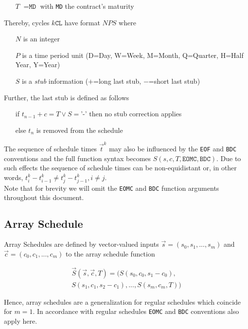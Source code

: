 \documentclass[9pt,oneside]{amsart}
\newcommand{\attr}[1]{\texttt{#1}}
\newcommand{\sdl}[3]{S(#1,#2,#3)}
\newcommand{\vsdl}[3]{\vec{S}(#1,#2,#3)}
\begin{document}
\begin{multicols}{2}
\begin{itemize}
	\item[$T$] $=\attr{MD}$ with \attr{MD} the contract's maturity
\end{itemize}

Thereby, cycles $k\attr{CL}$ have format $NPS$ where

\begin{itemize}
	\item[$N$] is an integer
	\item[$P$] is a time period unit (D=Day, W=Week, M=Month, Q=Quarter, H=Half Year, Y=Year)
	\item[$S$] is a \textit{stub} information ($+$=long last stub, $-$=short last stub)
\end{itemize}

Further, the last stub is defined as follows

\begin{itemize}
	\item[if] $t_{n-1}+c=T \lor S=$'-' then no stub correction applies

	\item[else] $t_n$ is removed from the schedule
\end{itemize}

The sequence of schedule times $\vec{t}^k$ may also be influenced by the \attr{EOF} and \attr{BDC} conventions and the full function syntax becomes $\sdl{s}{c}{T, \attr{EOMC}, \attr{BDC}}$. Due to such effects the sequence of schedule times can be non-equidistant or, in other words, $t_i^k-t_{i-1}^k\neq t_j^k-t_{j-1}^k, i\neq j$.\\

Note that for brevity we will omit the \attr{EOMC} and \attr{BDC} function arguments throughout this document.


\subsection{Array Schedule}\label{sec:arrayschedule}

Array Schedules are defined by vector-valued inputs $\vec{s}=(s_0,s_1,...,s_m)$ and $\vec{c}=(c_0,c_1,...,c_m)$ to the array schedule function

\begin{multline*}
	\vsdl{\vec{s}}{\vec{c}}{T} = (\sdl{s_0}{c_0}{s_1-c_0},\\
					\sdl{s_1}{c_1}{s_2-c_1},...,\sdl{s_m}{c_m}{T})
\end{multline*}


Hence, array schedules are a generalization for regular schedules which coincide for $m=1$. In accordance with regular schedules \attr{EOMC} and \attr{BDC} conventions also apply here.



\end{multicols}
\end{document}
